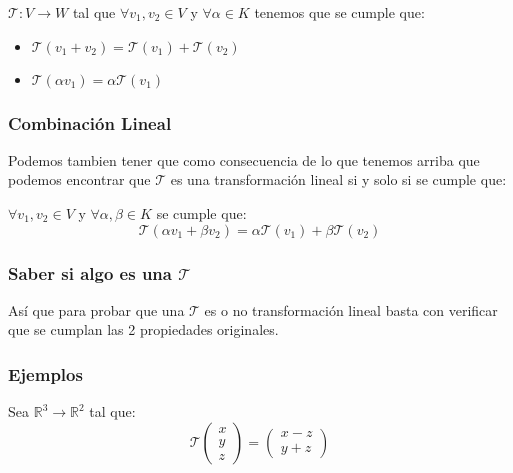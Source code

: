 \documentclass[12pt]{report}                                %
\begin{document}
        $\mathscr{T}: V \to W $ tal que $\forall v_1, v_2 \in V $ y $\forall \alpha \in K$
        tenemos que se cumple que:

        \begin{itemize}
            \item $\mathscr{T} (v_1 + v_2) = \mathscr{T}(v_1) + \mathscr{T}(v_2)$
            \item $\mathscr{T} (\alpha v_1) = \alpha \mathscr{T}(v_1)$ 
        \end{itemize}

        \subsubsection{Combinación Lineal}
        Podemos tambien tener que como consecuencia de lo que tenemos arriba que podemos
        encontrar que $\mathscr{T}$ es una transformación lineal si y solo si se cumple que:

        $\forall v_1, v_2 \in V$ y $\forall \alpha, \beta \in K$ se cumple que:
        \begin{equation}
            \mathscr{T}(\alpha v_1 + \beta v_2) = \alpha \mathscr{T}(v_1) + \beta \mathscr{T}(v_2)
        \end{equation}

        \subsubsection{Saber si algo es una $\mathscr{T}$}
        Así que para probar que una $\mathscr{T}$ es o no transformación lineal basta con verificar
        que se cumplan las 2 propiedades originales. 

        \clearpage
        \subsubsection{Ejemplos}
            Sea $\mathbb{R}^3 \to \mathbb{R}^2$ tal que:
            \begin{equation*}
                \mathscr{T}\left( \begin{matrix} x\\y\\z \end{matrix} \right) =
                \left( \begin{matrix} x-z\\y+z \end{matrix} \right)
            \end{equation*}
\end{document}
